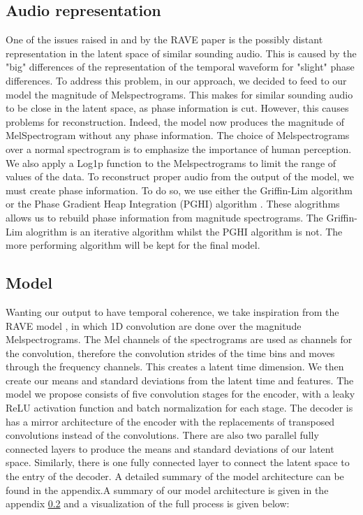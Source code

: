 \documentclass{article}
\begin{document}


\subsection{Audio representation}

One of the issues raised in and by the RAVE paper \cite{caillonRAVEVariationalAutoencoder2021} is the possibly distant representation in the latent space of similar sounding audio. This is caused by the "big" differences of the representation of the temporal waveform for "slight" phase differences. To address this problem, in our approach, we decided to feed to our model the magnitude of Melspectrograms. This makes for similar sounding audio to be close in the latent space, as phase information is cut. However, this causes problems for reconstruction. Indeed, the model now produces the magnitude of MelSpectrogram without any phase information. The choice of Melspectrograms over a normal spectrogram is to emphasize the importance of human perception. We also apply a Log1p function to the Melspectrograms to limit the range of values of the data. 
To reconstruct proper audio from the output of the model, we must create phase information. To do so, we use either the Griffin-Lim algorithm \cite{griff1984} or the Phase Gradient Heap Integration (PGHI) algorithm \cite{pghi2017}. These alogrithms allows us to rebuild phase information from magnitude spectrograms. The Griffin-Lim alogrithm is an iterative algorithm whilst the PGHI algorithm is not. The more performing algorithm will be kept for the final model. 

\subsection{Model}

Wanting our output to have temporal coherence, we take inspiration from the RAVE model \cite{caillonRAVEVariationalAutoencoder2021}, in which 1D convolution are done over the magnitude Melspectrograms. The Mel channels of the spectrograms are used as channels for the convolution, therefore the convolution strides of the time bins and moves through the frequency channels. This creates a latent time dimension. We then create our means and standard deviations from the latent time and features. The model we propose consists of five convolution stages for the encoder, with a leaky ReLU activation function and batch normalization for each stage. The decoder is has a mirror architecture of the encoder with the replacements of transposed convolutions instead of the convolutions. There are also two parallel fully connected layers to produce the means and standard deviations of our latent space. Similarly, there is one fully connected layer to connect the latent space to the entry of the decoder. A detailed summary of the model architecture can be found in the appendix.A summary of our model architecture is given in the appendix \ref{} and a visualization of the full process is given below:
\end{document}

